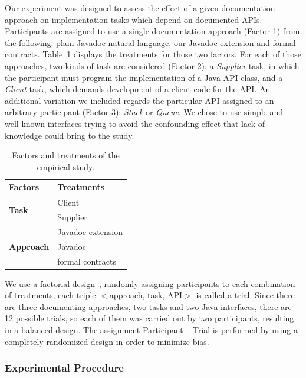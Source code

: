 Our experiment was designed to assess the effect of a given documentation approach on implementation tasks which depend on documented APIs. 
Participants are assigned to use a single documentation approach (Factor 1) from the following: plain Javadoc natural language, our Javadoc extension and formal contracts. Table~\ref{tab:factorsEmpStudy} displays the treatments for those two factors.
For each of those approaches, two kinds of task are considered (Factor 2): a \textit{Supplier} task, in which the participant must program the implementation of a Java API class, and a \textit{Client} task, which demands development of a client code for the API.
An additional variation we included regards the particular API assigned to an arbitrary participant (Factor 3): \textit{Stack} or \textit{Queue}. We chose to use simple and well-known interfaces trying to avoid the confounding effect that lack of knowledge could bring to the study.


\begin{table}[ht]
\caption{Factors and treatments of the empirical study.}
\label{tab:factorsEmpStudy}
\centering
\begin{tabular}{ll} \toprule
\bfseries Factors & \bfseries Treatments \\
\hline

\multirow{2}{*}{\textbf{Task}} & Client \\
& Supplier \\ \hline 

\multirow{3}{*}{\textbf{Approach}} & Javadoc extension \\
 & Javadoc \\
& formal contracts \\ \bottomrule
\end{tabular}
\end{table}

We use a factorial design~\cite{wohlin}, randomly assigning participants to each combination of treatments; each triple
$<$approach, task, API$>$ is called a trial.
Since there are three documenting approaches, two tasks and two Java interfaces, there are 12 possible trials, so each of them was carried out by two participants, resulting in a balanced design. 
The assignment Participant -- Trial is performed by using a
completely randomized design in order to minimize bias.


\subsubsection{Experimental Procedure}
\label{sec:expProcedure}

